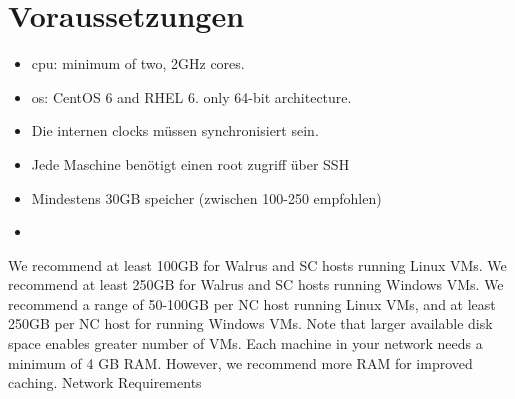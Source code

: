 \documentclass[a4paper,nochapterprefix,ngerman,12pt]{scrreprt}
\begin{document}
\section{Voraussetzungen}

\begin{itemize}
\item \gls{cpu}: minimum of two, 2GHz cores.
\item \gls{os}:  CentOS 6 and RHEL 6. only  64-bit architecture. 
\item Die internen clocks müssen synchronisiert sein.
\item Jede Maschine benötigt einen root zugriff über SSH
\item Mindestens 30GB speicher (zwischen 100-250 empfohlen)
\item 
\end{itemize}





We recommend at least 100GB for Walrus and SC hosts running Linux VMs. We recommend at least 250GB for Walrus and SC hosts running Windows VMs.
We recommend a range of 50-100GB per NC host running Linux VMs, and at least 250GB per NC host for running Windows VMs. Note that larger available disk space enables greater number of VMs.
Each machine in your network needs a minimum of 4 GB RAM. However, we recommend more RAM for improved caching.
Network Requirements
\end{document}
